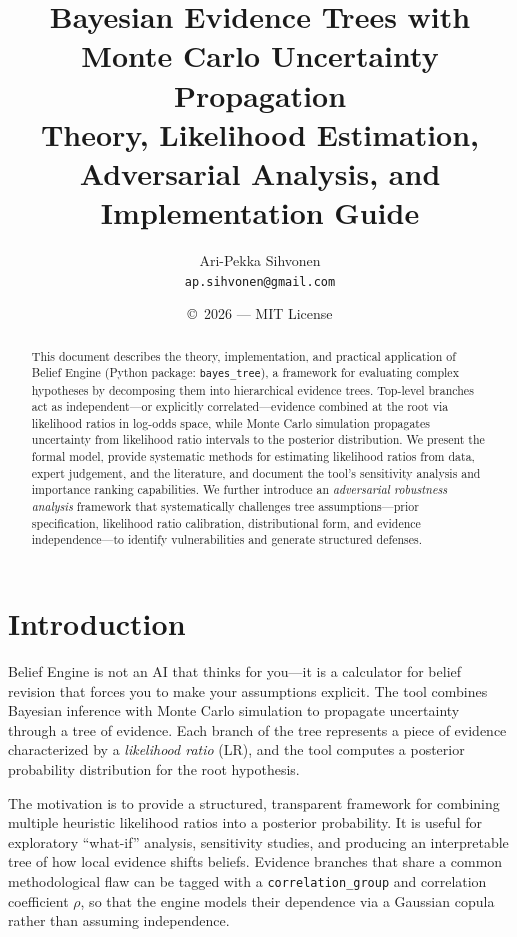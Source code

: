 \documentclass[11pt,a4paper]{article}
\title{Bayesian Evidence Trees with Monte Carlo Uncertainty Propagation\\[0.5em]
\large Theory, Likelihood Estimation, Adversarial Analysis, and Implementation Guide}
\author{Ari-Pekka Sihvonen\\
\texttt{ap.sihvonen@gmail.com}}
\date{\copyright\ 2026 — MIT License}
\begin{document}
\maketitle

\begin{abstract}
This document describes the theory, implementation, and practical application of
Belief Engine (Python package: \texttt{bayes\_tree}), a framework for evaluating
complex hypotheses by decomposing them into hierarchical evidence trees.
Top-level branches act as independent---or explicitly correlated---evidence
combined at the root via likelihood ratios in log-odds space, while Monte Carlo
simulation propagates uncertainty from likelihood ratio intervals to the
posterior distribution. We present the formal model, provide systematic methods
for estimating likelihood ratios from data, expert judgement, and the
literature, and document the tool's sensitivity analysis and importance ranking
capabilities. We further introduce an \emph{adversarial robustness analysis}
framework that systematically challenges tree assumptions---prior specification,
likelihood ratio calibration, distributional form, and evidence
independence---to identify vulnerabilities and generate structured defenses.
\end{abstract}

\tableofcontents
\newpage

\section{Introduction}

Belief Engine is not an AI that thinks for you---it is a calculator for belief
revision that forces you to make your assumptions explicit.  The tool combines
Bayesian inference with Monte Carlo simulation to propagate uncertainty through
a tree of evidence.  Each branch of the tree represents a piece of evidence
characterized by a \emph{likelihood ratio} (LR), and the tool computes a
posterior probability distribution for the root hypothesis.

The motivation is to provide a structured, transparent framework for combining
multiple heuristic likelihood ratios into a posterior probability.  It is useful
for exploratory ``what-if'' analysis, sensitivity studies, and producing an
interpretable tree of how local evidence shifts beliefs.  Evidence branches that
share a common methodological flaw can be tagged with a
\texttt{correlation\_group} and correlation coefficient $\rho$, so that the
engine models their dependence via a Gaussian copula rather than assuming
independence.
\end{document}
